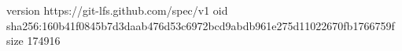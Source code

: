version https://git-lfs.github.com/spec/v1
oid sha256:160b41f0845b7d3daab476d53c6972bcd9abdb961e275d11022670fb1766759f
size 174916

